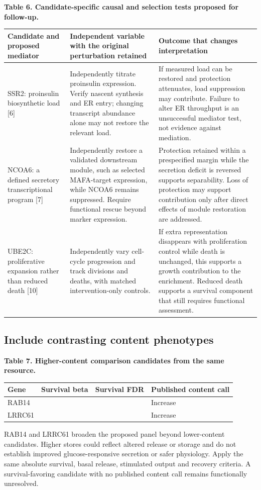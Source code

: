 \documentclass[10pt,letterpaper]{article}
\begin{document}
{\small\textbf{Table 6. Candidate-specific causal and selection tests proposed for follow-up.}\par}
{\small\begin{longtable}{>{\raggedright\arraybackslash}p{1.14in}>{\raggedright\arraybackslash}p{2.41in}>{\raggedright\arraybackslash}p{2.37in}}\toprule
\textbf{Candidate and proposed mediator} & \textbf{Independent variable with the original perturbation retained} & \textbf{Outcome that changes interpretation}\\\midrule\endhead
SSR2: proinsulin biosynthetic load [6] & Independently titrate proinsulin expression. Verify nascent synthesis and ER entry; changing transcript abundance alone may not restore the relevant load. & If measured load can be restored and protection attenuates, load suppression may contribute. Failure to alter ER throughput is an unsuccessful mediator test, not evidence against mediation.\\
NCOA6: a defined secretory transcriptional program [7] & Independently restore a validated downstream module, such as selected MAFA-target expression, while NCOA6 remains suppressed. Require functional rescue beyond marker expression. & Protection retained within a prespecified margin while the secretion deficit is reversed supports separability. Loss of protection may support contribution only after direct effects of module restoration are addressed.\\
UBE2C: proliferative expansion rather than reduced death [10] & Independently vary cell-cycle progression and track divisions and deaths, with matched intervention-only controls. & If extra representation disappears with proliferation control while death is unchanged, this supports a growth contribution to the enrichment. Reduced death supports a survival component that still requires functional assessment.\\
\bottomrule\end{longtable}}
\subsection*{Include contrasting content phenotypes}
{\small\textbf{Table 7. Higher-content comparison candidates from the same resource.}\par}
{\small\begin{longtable}{>{\raggedright\arraybackslash}p{1.05in}>{\raggedright\arraybackslash}p{1.23in}>{\raggedright\arraybackslash}p{1.23in}>{\raggedright\arraybackslash}p{2.41in}}\toprule
\textbf{Gene} & \textbf{Survival beta} & \textbf{Survival FDR} & \textbf{Published content call}\\\midrule\endhead
RAB14 & 0.39401 & 0.072165 & Increase\\
LRRC61 & 0.36097 & 0.082581 & Increase\\
\bottomrule\end{longtable}}
RAB14 and LRRC61 broaden the proposed panel beyond lower-content candidates. Higher stores could reflect altered release or storage and do not establish improved glucose-responsive secretion or safer physiology. Apply the same absolute survival, basal release, stimulated output and recovery criteria. A survival-favoring candidate with no published content call remains functionally unresolved.
\end{document}
